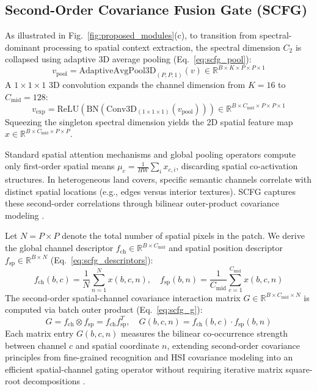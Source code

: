 \documentclass[manuscript,screen,review]{acmart}
\begin{document}
\subsection{Second-Order Covariance Fusion Gate (SCFG)}
\label{subsec:scfg}
As illustrated in Fig.~\ref{fig:proposed_modules}(c), to transition from spectral-dominant processing to spatial context extraction, the spectral dimension $C_2$ is collapsed using adaptive 3D average pooling (Eq.~\ref{eq:scfg_pool}):
\begin{equation}
\label{eq:scfg_pool}
v_{\text{pool}} = \text{AdaptiveAvgPool3D}_{(P, P, 1)}(v) \in \mathbb{R}^{B \times K \times P \times P \times 1}
\end{equation}
A $1 \times 1 \times 1$ 3D convolution expands the channel dimension from $K=16$ to $C_{\text{mid}} = 128$:
\begin{equation}
\label{eq:scfg_expand}
v_{\text{exp}} = \text{ReLU}\left(\text{BN}\left(\text{Conv3D}_{(1 \times 1 \times 1)}(v_{\text{pool}})\right)\right) \in \mathbb{R}^{B \times C_{\text{mid}} \times P \times P \times 1}
\end{equation}
Squeezing the singleton spectral dimension yields the 2D spatial feature map $x \in \mathbb{R}^{B \times C_{\text{mid}} \times P \times P}$.

Standard spatial attention mechanisms and global pooling operators compute only first-order spatial means $\mu_c = \frac{1}{HW}\sum_{i} x_{c, i}$, discarding spatial co-activation structures. In heterogeneous land covers, specific semantic channels correlate with distinct spatial locations (e.g., edges versus interior textures). SCFG captures these second-order correlations through bilinear outer-product covariance modeling \cite{lin2015bilinear}.

Let $N = P \times P$ denote the total number of spatial pixels in the patch. We derive the global channel descriptor $f_{\text{ch}} \in \mathbb{R}^{B \times C_{\text{mid}}}$ and spatial position descriptor $f_{\text{sp}} \in \mathbb{R}^{B \times N}$ (Eq.~\ref{eq:scfg_descriptors}):
\begin{equation}
\label{eq:scfg_descriptors}
f_{\text{ch}}(b, c) = \frac{1}{N} \sum_{n=1}^N x(b, c, n), \quad f_{\text{sp}}(b, n) = \frac{1}{C_{\text{mid}}} \sum_{c=1}^{C_{\text{mid}}} x(b, c, n)
\end{equation}
The second-order spatial-channel covariance interaction matrix $G \in \mathbb{R}^{B \times C_{\text{mid}} \times N}$ is computed via batch outer product (Eq.~\ref{eq:scfg_g}):
\begin{equation}
\label{eq:scfg_g}
G = f_{\text{ch}} \otimes f_{\text{sp}} = f_{\text{ch}} f_{\text{sp}}^T, \quad G(b, c, n) = f_{\text{ch}}(b, c) \cdot f_{\text{sp}}(b, n)
\end{equation}
Each matrix entry $G(b, c, n)$ measures the bilinear co-occurrence strength between channel $c$ and spatial coordinate $n$, extending second-order covariance principles from fine-grained recognition \cite{lin2015bilinear, gao2019global} and HSI covariance modeling \cite{fang2018new, he2019feature, xue2021attention, zheng2021hyperspectral} into an efficient spatial-channel gating operator without requiring iterative matrix square-root decompositions \cite{li2018towards}.
\end{document}

